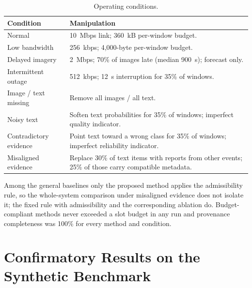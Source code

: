 \documentclass[conference,a4paper]{IEEEtran}
\newif\ifsubmission
\newcommand{\masteronly}[1]{\ifsubmission\else#1\fi}
\begin{document}
\masteronly{%
\begin{table}[t]
\caption{Operating conditions.}
\label{tab:conditions}
\centering\footnotesize
\begin{tabular}{@{}p{2.3cm}p{5.2cm}@{}}
\toprule
Condition & Manipulation \\
\midrule
Normal & 10~Mbps link; 360~kB per-window budget. \\
Low bandwidth & 256~kbps; 4,000-byte per-window budget. \\
Delayed imagery & 2~Mbps; 70\% of images late (median 900~s); forecast only. \\
Intermittent outage & 512~kbps; 12~s interruption for 35\% of windows. \\
Image / text missing & Remove all images / all text. \\
Noisy text & Soften text probabilities for 35\% of windows; imperfect quality indicator. \\
Contradictory evidence & Point text toward a wrong class for 35\% of windows; imperfect reliability indicator. \\
Misaligned evidence & Replace 30\% of text items with reports from other events; 25\% of those carry compatible metadata. \\
\bottomrule
\end{tabular}
\end{table}}%


Among the general baselines only the proposed method applies the admissibility rule, so the whole-system comparison under misaligned evidence does not isolate it; the fixed rule with admissibility and the corresponding ablation do. Budget-compliant methods never exceeded a slot budget in any run and provenance completeness was 100\% for every method and condition.

\section{Confirmatory Results on the Synthetic Benchmark}
\label{sec:results}
\end{document}
